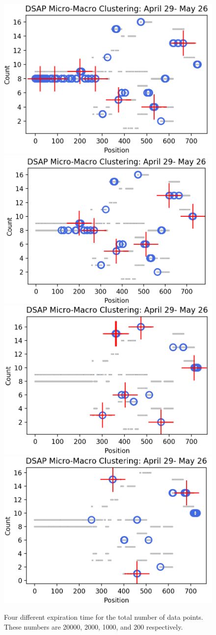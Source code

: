 \begin{figure}
    \centering
        \includegraphics[width = 7.5 cm]{image/Chapters/Chapter6/DSAPalldays.png}\hfill
        \includegraphics[width = 7.5 cm]{image/Chapters/Chapter6/DSAPalldays2000fad.png}\hfill
        \includegraphics[width = 7.5 cm]{image/Chapters/Chapter6/DSAPalldays1000fad.png}\hfill
        \includegraphics[width = 7.5 cm]{image/Chapters/Chapter6/DSAPalldays200fad.png}\hfill
    \caption{Four different expiration time for the total number of data points. These numbers are 20000, 2000, 1000, and 200 respectively.}
    \label{expirationchang}
\end{figure}



